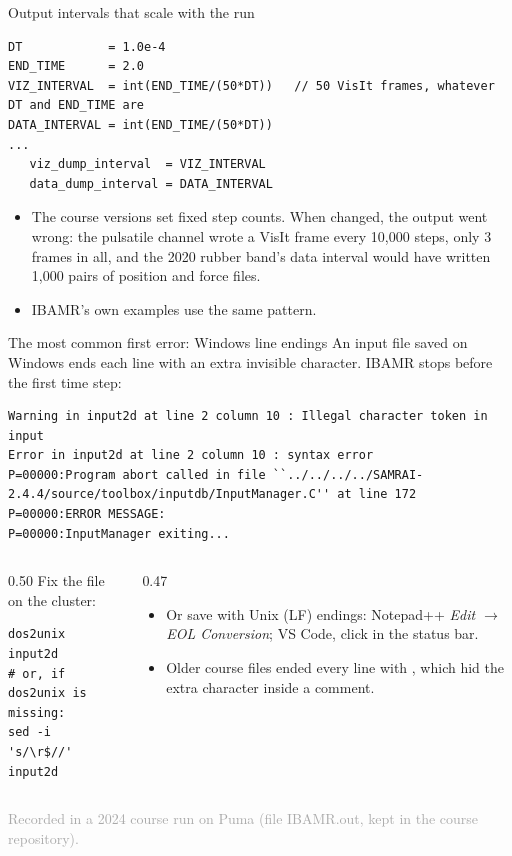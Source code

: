 \documentclass[aspectratio=169,11pt]{beamer}
\newcommand{\sourcecredit}[1]{\vfill\hfill{\tiny\textcolor{DarkGray}{#1}}}
\begin{document}
\begin{frame}[fragile]{Output intervals that scale with the run}
\begin{lstlisting}
DT            = 1.0e-4
END_TIME      = 2.0
VIZ_INTERVAL  = int(END_TIME/(50*DT))   // 50 VisIt frames, whatever DT and END_TIME are
DATA_INTERVAL = int(END_TIME/(50*DT))
...
   viz_dump_interval  = VIZ_INTERVAL
   data_dump_interval = DATA_INTERVAL
\end{lstlisting}
\begin{itemize}\small
  \item The course versions set fixed step counts. When  changed, the output went wrong: the pulsatile channel wrote a VisIt frame every 10{,}000 steps, only 3 frames in all, and the 2020 rubber band's data interval would have written 1{,}000 pairs of position and force files.
  \item IBAMR's own examples use the same  pattern.
\end{itemize}
\end{frame}

\begin{frame}[fragile]{The most common first error: Windows line endings}
An input file saved on Windows ends each line with an extra invisible character. IBAMR stops before the first time step:
\begin{lstlisting}
Warning in input2d at line 2 column 10 : Illegal character token in input
Error in input2d at line 2 column 10 : syntax error
P=00000:Program abort called in file ``../../../../SAMRAI-2.4.4/source/toolbox/inputdb/InputManager.C'' at line 172
P=00000:ERROR MESSAGE:
P=00000:InputManager exiting...
\end{lstlisting}
\begin{columns}[T,onlytextwidth]
\begin{column}{0.50\textwidth}
\small Fix the file on the cluster:
\begin{lstlisting}[style=shell]
dos2unix input2d
# or, if dos2unix is missing:
sed -i 's/\r$//' input2d
\end{lstlisting}
\end{column}
\begin{column}{0.47\textwidth}
\begin{itemize}\small
  \item Or save with Unix (LF) endings: Notepad++ \emph{Edit $\to$ EOL Conversion}; VS Code, click  in the status bar.
  \item Older course files ended every line with \code{//}, which hid the extra character inside a comment.
\end{itemize}
\end{column}
\end{columns}
\sourcecredit{Recorded in a 2024 course run on Puma (file IBAMR.out, kept in the course repository).}
\end{frame}
\end{document}
